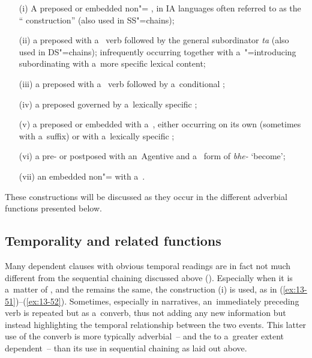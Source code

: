 \begin{enumerate}
\item[(i)] A preposed or embedded non"=  , in IA languages often referred to as the `` construction'' (also used in SS"=chains);

\item[(ii)] a preposed  with a~ verb followed by the general subordinator \textit{ta} (also used in DS"=chains); infrequently occurring together with a~"=introducing subordinating  with a~more specific lexical content;

\item[(iii)] a preposed  with a~ verb followed by a~conditional ;

\item[(iv)] a preposed   governed by a~lexically specific ;

\item[(v)] a preposed or embedded  with a~, either occurring on its own (sometimes with a~suffix) or with a~lexically specific ;

\item[(vi)] a pre- or postposed  with an~Agentive  and a~ form of \textit{bhe-} `become';

\item[(vii)] an embedded non"=  with a~.
\end{enumerate}

These constructions will be discussed as they occur in the different adverbial functions presented below. 


\subsection{Temporality and related functions}
\label{subsec:13-4-1}

 Many dependent clauses with obvious temporal readings are in fact not much different from the sequential chaining discussed above (). Especially when it is a~matter of , and the  remains the same, the  construction (i) is used, as in (\ref{ex:13-51})--(\ref{ex:13-52}). Sometimes, especially in narratives, an~immediately preceding  verb is repeated but as a~converb, thus not adding any new information but instead highlighting the temporal relationship between the two events. This latter use of the converb is more typically adverbial~-- and the   to a~greater extent dependent~-- than its use in sequential chaining as laid out above.

